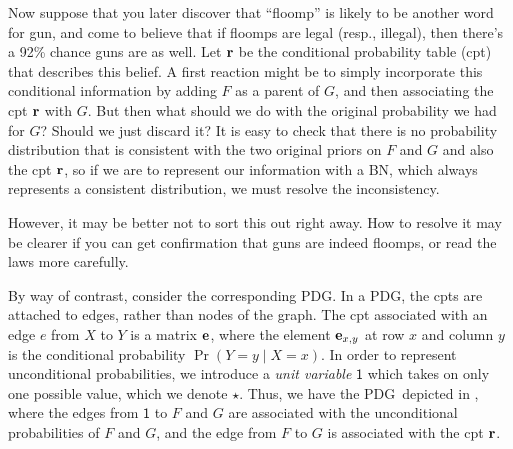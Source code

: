 \documentclass{article}
\newcommand{\MN}{PDG}
\numberwithin{equation}{section}
\begin{document}
\begin{example}
		Now suppose that you later discover that ``floomp'' is likely to be another word for gun, and come to believe that if floomps are legal (resp., illegal), then there's a 92\% chance guns are as well. Let $\mathbf r$ be the conditional probability table (cpt) that describes this belief. A first reaction might be to simply incorporate this conditional information by adding $F$ as a parent of $G$, and then associating the cpt $\mathbf r$ with $G$. But then what should we do with the original probability we had for $G$?  Should we just discard it?
		It is easy to check that there is no probability distribution that is consistent with the two original priors on $F$ and $G$ and also the cpt $\mathbf r$, so if we are to represent our information with a BN, which always represents a consistent distribution, we must resolve the inconsistency.  
			
%		
		However, it may be better not to sort this out right away. How to resolve it may be clearer if you can get confirmation that guns are indeed floomps, or read the laws more carefully.

		By way of contrast, consider the corresponding \MN.
		In a \MN, the cpts are attached to edges, rather than nodes of the graph. The cpt associated with an edge $e$ from $X$ to $Y$ is a matrix $\mathbf e$, where the element $\mathbf e_{x,y}$ at row $x$ and column $y$ is the conditional probability $\Pr(Y \!\!=\!\!y \mid X \!\!=\!\! x)$. In order to represent unconditional probabilities, we introduce a \emph{unit variable} $\mathsf 1$ which takes on only one possible value,	which we denote $\star$. Thus, we have the \MN\ depicted in , where the edges from $\mathsf 1$ to $F$ and $G$ are associated with the unconditional probabilities of $F$ and $G$, and the edge from $F$ to $G$ is associated with the cpt $\mathbf r$.
		\begin{figure}[h]
			\centering
\end{figure}
\end{example}
\end{document}
